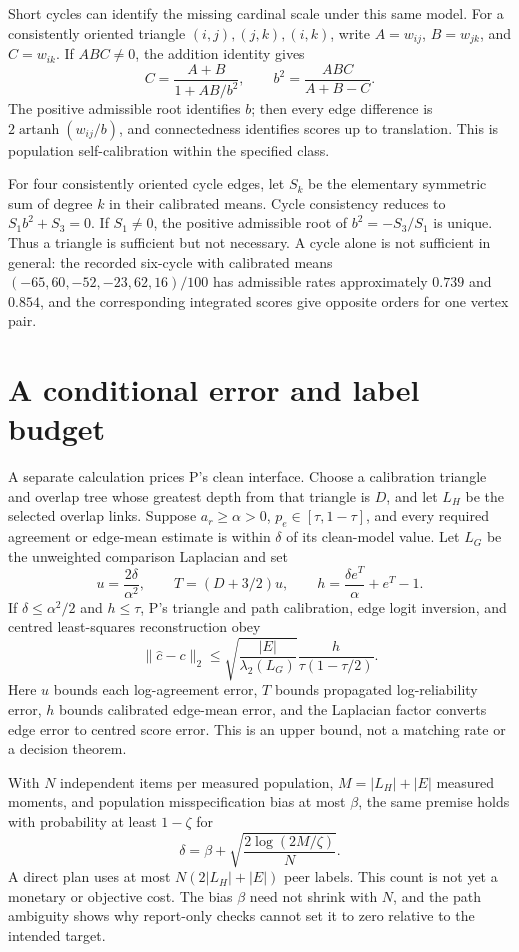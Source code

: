 \documentclass{article}
\begin{document}
Short cycles can identify the missing cardinal scale under this same model. For a consistently
oriented triangle \((i,j),(j,k),(i,k)\), write \(A=w_{ij}\), \(B=w_{jk}\), and \(C=w_{ik}\). If
\(ABC\ne0\), the addition identity gives
\[
C=\frac{A+B}{1+AB/b^2},
\qquad b^2=\frac{ABC}{A+B-C}.
\]
The positive admissible root identifies \(b\); then every edge difference is
\(2\operatorname{artanh}(w_{ij}/b)\), and connectedness identifies scores up to translation. This is
population self-calibration within the specified class. %

For four consistently oriented cycle edges, let \(S_k\) be the elementary symmetric sum of degree
\(k\) in their calibrated means. Cycle consistency reduces to \(S_1b^2+S_3=0\). If \(S_1\ne0\), the
positive admissible root of \(b^2=-S_3/S_1\) is unique. Thus a triangle is sufficient but not
necessary. %
A cycle alone is not sufficient in general: the recorded six-cycle with calibrated means
\((-65,60,-52,-23,62,16)/100\) has admissible rates approximately \(0.739\) and \(0.854\), and the
corresponding integrated scores give opposite orders for one vertex pair. %

\section{A conditional error and label budget}
A separate calculation prices P's clean interface. Choose a calibration triangle and overlap tree
whose greatest depth from that triangle is \(D\), and let \(L_H\) be the selected overlap links.
Suppose \(a_r\geq\alpha>0\), \(p_e\in[\tau,1-\tau]\), and every required agreement or edge-mean
estimate is within \(\delta\) of its clean-model value. Let \(L_G\) be the unweighted comparison
Laplacian and set
\[
u=\frac{2\delta}{\alpha^2},\qquad
T=(D+3/2)u,\qquad
h=\frac{\delta e^T}{\alpha}+e^T-1.
\]
If \(\delta\leq\alpha^2/2\) and \(h\leq\tau\), P's triangle and path calibration, edge logit
inversion, and centred least-squares reconstruction obey
\[
\|\widehat c-c\|_2\leq
\sqrt{\frac{|E|}{\lambda_2(L_G)}}
\frac{h}{\tau(1-\tau/2)}.
\]
Here \(u\) bounds each log-agreement error, \(T\) bounds propagated log-reliability error, \(h\)
bounds calibrated edge-mean error, and the Laplacian factor converts edge error to centred score
error. This is an upper bound, not a matching rate or a decision theorem. %

With \(N\) independent items per measured population, \(M=|L_H|+|E|\) measured moments, and
population misspecification bias at most \(\beta\), the same premise holds with probability at least
\(1-\zeta\) for
\[
\delta=\beta+\sqrt{\frac{2\log(2M/\zeta)}{N}}.
\]
A direct plan uses at most \(N(2|L_H|+|E|)\) peer labels. This count is not yet a monetary or
objective cost. The bias \(\beta\) need not shrink with \(N\), and the path ambiguity shows why
report-only checks cannot set it to zero relative to the intended target. %
\end{document}
